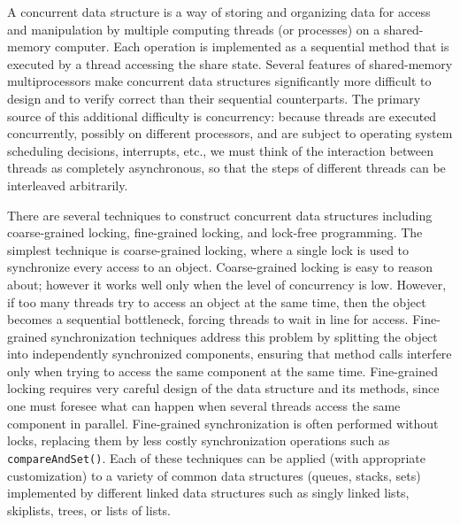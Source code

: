 A concurrent data structure is a way of storing and organizing data for access and manipulation by multiple computing threads (or processes) on a shared-memory computer. Each operation is implemented as a sequential
method that is executed by a thread accessing the share state. Several features of shared-memory multiprocessors make concurrent data structures significantly more difficult to design and to verify correct than their sequential counterparts. The primary source of this additional difficulty is concurrency: because threads are executed concurrently, possibly on different processors, and are subject to operating system scheduling decisions, interrupts, etc., we must think of the interaction between threads as completely asynchronous, so that the steps of different threads can be interleaved arbitrarily. %



There are several techniques to construct concurrent data structures including coarse-grained locking, fine-grained locking, and lock-free programming. The simplest technique is coarse-grained locking, where a single lock is used to synchronize every access to an object. Coarse-grained locking is easy to reason about; however it works well only when the level of concurrency is low. However, if too many threads try to access an object at the same time, then the object becomes a sequential bottleneck, forcing threads to wait in line for access. Fine-grained synchronization techniques address this problem by splitting the object into independently synchronized components, ensuring that method calls interfere only when trying to access the same component at the same time. Fine-grained locking requires very careful design of the data structure and its
methods, since one must foresee what can happen when several threads access
the same component in parallel.
Fine-grained synchronization is often performed without locks, replacing them by less costly
synchronization operations such as {\tt compareAndSet()}. Each of these techniques can be applied (with appropriate customization) to a variety of common data structures (queues, stacks, sets) implemented by different linked data structures such as singly linked lists, skiplists, trees, or lists of lists. 


\vspace{1cm}





